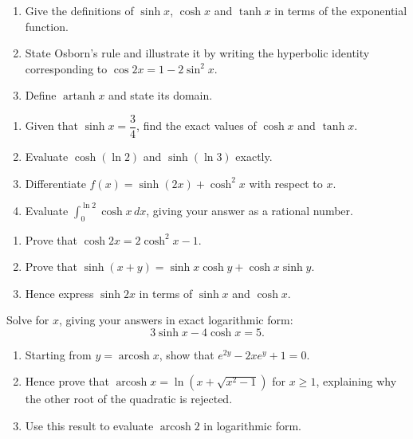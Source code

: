 \documentclass[11pt]{article}
\newcounter{popsec}
\newcounter{popsub}
\newcommand{\courssub}[1]{%
  \stepcounter{popsub}%
  \par\vspace{9pt}\noindent{\popxbold\fontsize{11.5}{13}\selectfont\color{popink}{\color{poporange}\thepopsec.\thepopsub}\hspace{6pt}#1}\par\nopagebreak\vspace{4pt}
}
\begin{document}
\begin{exercice}[Definitions]
\begin{enumerate}
\item Give the definitions of $\sinh x$, $\cosh x$ and $\tanh x$ in terms of the exponential function.
\item State Osborn's rule and illustrate it by writing the hyperbolic identity corresponding to $\cos 2x = 1 - 2\sin^2 x$.
\item Define $\operatorname{artanh} x$ and state its domain.
\end{enumerate}
\end{exercice}

\begin{exercice}
\begin{enumerate}
\item Given that $\sinh x = \dfrac{3}{4}$, find the exact values of $\cosh x$ and $\tanh x$.
\item Evaluate $\cosh(\ln 2)$ and $\sinh(\ln 3)$ exactly.
\item Differentiate $f(x) = \sinh(2x) + \cosh^2 x$ with respect to $x$.
\item Evaluate $\displaystyle\int_0^{\ln 2} \cosh x\, dx$, giving your answer as a rational number.
\end{enumerate}
\end{exercice}

\courssub{I practise}

\begin{exercice}
\begin{enumerate}
\item Prove that $\cosh 2x = 2\cosh^2 x - 1$.
\item Prove that $\sinh(x + y) = \sinh x \cosh y + \cosh x \sinh y$.
\item Hence express $\sinh 2x$ in terms of $\sinh x$ and $\cosh x$.
\end{enumerate}
\end{exercice}

\begin{exercice}
Solve for $x$, giving your answers in exact logarithmic form:
\[ 3\sinh x - 4\cosh x = 5. \]
\end{exercice}

\begin{exercice}
\begin{enumerate}
\item Starting from $y = \operatorname{arcosh} x$, show that $e^{2y} - 2xe^y + 1 = 0$.
\item Hence prove that $\operatorname{arcosh} x = \ln\left(x + \sqrt{x^2 - 1}\right)$ for $x \geq 1$, explaining why the other root of the quadratic is rejected.
\item Use this result to evaluate $\operatorname{arcosh} 2$ in logarithmic form.
\end{enumerate}
\end{exercice}
\end{document}
